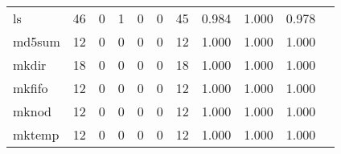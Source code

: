 \begin{longtable}{lp{1.2cm}p{1.2cm}p{1.2cm}p{1.2cm}p{1.2cm}p{1.2cm}p{1.2cm}p{1.2cm}p{1.2cm}p{1.2cm}}
ls        &                                    46 &                                                  0 &                                                  1 &                                                  0 &                                                  0 &                                                 45 &                                              0.984 &                                              1.000 &                                              0.978 \\
md5sum    &                                    12 &                                                  0 &                                                  0 &                                                  0 &                                                  0 &                                                 12 &                                              1.000 &                                              1.000 &                                              1.000 \\
mkdir     &                                    18 &                                                  0 &                                                  0 &                                                  0 &                                                  0 &                                                 18 &                                              1.000 &                                              1.000 &                                              1.000 \\
mkfifo    &                                    12 &                                                  0 &                                                  0 &                                                  0 &                                                  0 &                                                 12 &                                              1.000 &                                              1.000 &                                              1.000 \\
mknod     &                                    12 &                                                  0 &                                                  0 &                                                  0 &                                                  0 &                                                 12 &                                              1.000 &                                              1.000 &                                              1.000 \\
mktemp    &                                    12 &                                                  0 &                                                  0 &                                                  0 &                                                  0 &                                                 12 &                                              1.000 &                                              1.000 &                                              1.000 \\

\end{longtable}

